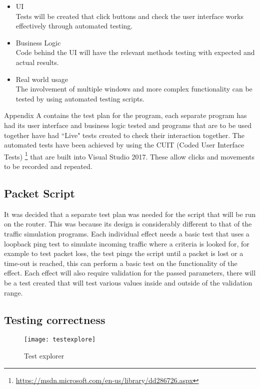 \begin{itemize}

	\item UI \\
	Tests will be created that click buttons and check the user interface works effectively through automated testing.

	\item Business Logic \\
	Code behind the UI will have the relevant methods testing with expected and actual results.

	\item Real world usage \\
	The involvement of multiple windows and more complex functionality can be tested by using automated testing 			scripts.
	
\end{itemize}

Appendix A contains the test plan for the program, each separate program has had its user interface and business logic tested and programs that are to be used together have had ``Live" tests created to check their interaction together. The automated tests have been achieved by using the CUIT (Coded User Interface Tests) \footnote{\url{https://msdn.microsoft.com/en-us/library/dd286726.aspx}} that are built into Visual Studio 2017. These allow clicks and movements to be recorded and repeated.

\subsection{Packet Script}
It was decided that a separate test plan was needed for the script that will be run on the router. This was because its design is considerably different to that of the traffic simulation programs. Each individual effect needs a basic test that uses a loopback ping test to simulate incoming traffic where a criteria is looked for, for example to test packet loss, the test pings the script until a packet is lost or a time-out is reached, this can perform a basic test on the functionality of the effect. Each effect will also require validation for the passed parameters, there will be a test created that will test various values inside and outside of the validation range.

\subsection{Testing correctness}
\begin{wrapfigure}{r}{5cm}
	\small
	\texttt{[image: testexplore]}
	\caption{Test explorer}
	\label{ref:visualstudiotest}
\end{wrapfigure}

